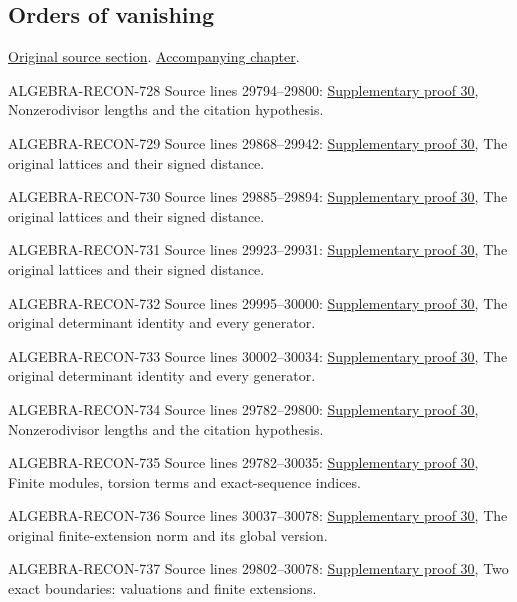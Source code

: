 \subsection{Orders of vanishing}
\hypertarget{algebra-source-section-orders-of-vanishing}{}
\noindent\href{https://github.com/stacks/stacks-project/blob/a04446e57ec1fbc252a871afcec7752fb2807b14/algebra.tex\#L29779}{Original source section}. \href{algebra.pdf\#nameddest=section-orders-of-vanishing}{Accompanying chapter}.

\begin{AlgebraSourceRoutes}
\item[ALGEBRA-RECON-728] Source lines 29794--29800: \hyperlink{algebra_orders_notes_20260928}{Supplementary proof 30}, Nonzerodivisor lengths and the citation hypothesis.
\item[ALGEBRA-RECON-729] Source lines 29868--29942: \hyperlink{algebra_orders_notes_20260928}{Supplementary proof 30}, The original lattices and their signed distance.
\item[ALGEBRA-RECON-730] Source lines 29885--29894: \hyperlink{algebra_orders_notes_20260928}{Supplementary proof 30}, The original lattices and their signed distance.
\item[ALGEBRA-RECON-731] Source lines 29923--29931: \hyperlink{algebra_orders_notes_20260928}{Supplementary proof 30}, The original lattices and their signed distance.
\item[ALGEBRA-RECON-732] Source lines 29995--30000: \hyperlink{algebra_orders_notes_20260928}{Supplementary proof 30}, The original determinant identity and every generator.
\item[ALGEBRA-RECON-733] Source lines 30002--30034: \hyperlink{algebra_orders_notes_20260928}{Supplementary proof 30}, The original determinant identity and every generator.
\item[ALGEBRA-RECON-734] Source lines 29782--29800: \hyperlink{algebra_orders_notes_20260928}{Supplementary proof 30}, Nonzerodivisor lengths and the citation hypothesis.
\item[ALGEBRA-RECON-735] Source lines 29782--30035: \hyperlink{algebra_orders_notes_20260928}{Supplementary proof 30}, Finite modules, torsion terms and exact-sequence indices.
\item[ALGEBRA-RECON-736] Source lines 30037--30078: \hyperlink{algebra_orders_notes_20260928}{Supplementary proof 30}, The original finite-extension norm and its global version.
\item[ALGEBRA-RECON-737] Source lines 29802--30078: \hyperlink{algebra_orders_notes_20260928}{Supplementary proof 30}, Two exact boundaries: valuations and finite extensions.
\end{AlgebraSourceRoutes}

